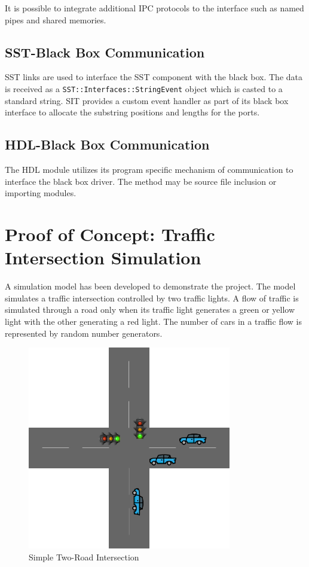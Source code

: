 \documentclass{article}
\begin{document}
    It is possible to integrate additional IPC protocols to the interface such as named pipes and
    shared memories.

    \subsection{SST-Black Box Communication}
    SST links are used to interface the SST component with the black box. The data is received as a
    \lstinline{SST::Interfaces::StringEvent} object which is casted to a standard string. SIT
    provides a custom event handler as part of its black box interface to allocate the substring
    positions and lengths for the ports.

    \subsection{HDL-Black Box Communication}
    The HDL module utilizes its program specific mechanism of communication to interface the black
    box driver. The method may be source file inclusion or importing modules.

\iffalse
  \section{Proof of Concept: Traffic Intersection Simulation}
  A simulation model has been developed to demonstrate the project. The model simulates a traffic
  intersection controlled by two traffic lights. A flow of traffic is simulated through a road only
  when its traffic light generates a green or yellow light with the other generating a red light.
  The number of cars in a traffic flow is represented by random number generators.

  \begin{figure}[!h]
    \centering
    \includegraphics[width=3.5in]{diagrams/intersection.png}
    \caption{Simple Two-Road Intersection}
    \label{fig:intersection}
  \end{figure}
\end{document}
